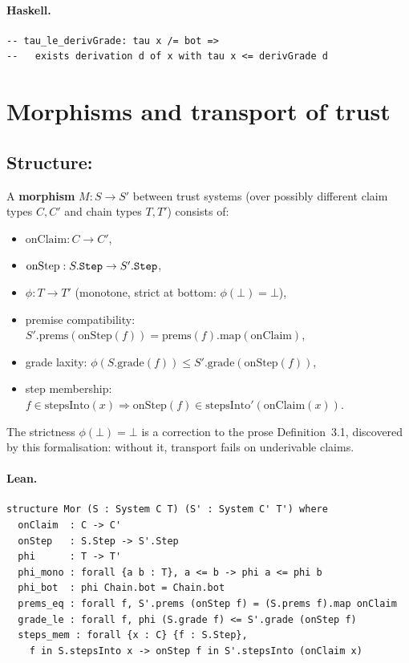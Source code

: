 \documentclass[11pt,a4paper]{article}
\begin{document}
\paragraph{Haskell.}
\begin{lstlisting}[style=haskell]
-- tau_le_derivGrade: tau x /= bot =>
--   exists derivation d of x with tau x <= derivGrade d
\end{lstlisting}

\section{Morphisms and transport of trust}

\subsection{Structure: }

\begin{defn}
A \textbf{morphism} $M : S \to S'$ between trust systems (over possibly
different claim types $C, C'$ and chain types $T, T'$) consists of:
\begin{itemize}
  \item $\mathrm{onClaim} : C \to C'$,
  \item $\mathrm{onStep} : S.\texttt{Step} \to S'.\texttt{Step}$,
  \item $\phi : T \to T'$ (monotone, strict at bottom: $\phi(\bot) = \bot$),
  \item premise compatibility: $S'.\mathrm{prems}(\mathrm{onStep}(f)) =
    \mathrm{prems}(f).\mathrm{map}(\mathrm{onClaim})$,
  \item grade laxity: $\phi(S.\mathrm{grade}(f)) \le
    S'.\mathrm{grade}(\mathrm{onStep}(f))$,
  \item step membership: $f \in \mathrm{stepsInto}(x) \Rightarrow
    \mathrm{onStep}(f) \in \mathrm{stepsInto}'(\mathrm{onClaim}(x))$.
\end{itemize}
The strictness $\phi(\bot) = \bot$ is a correction to the prose
Definition~3.1, discovered by this formalisation: without it, transport
fails on underivable claims.
\end{defn}

\paragraph{Lean.}
\begin{lstlisting}[style=lean]
structure Mor (S : System C T) (S' : System C' T') where
  onClaim  : C -> C'
  onStep   : S.Step -> S'.Step
  phi      : T -> T'
  phi_mono : forall {a b : T}, a <= b -> phi a <= phi b
  phi_bot  : phi Chain.bot = Chain.bot
  prems_eq : forall f, S'.prems (onStep f) = (S.prems f).map onClaim
  grade_le : forall f, phi (S.grade f) <= S'.grade (onStep f)
  steps_mem : forall {x : C} {f : S.Step},
    f in S.stepsInto x -> onStep f in S'.stepsInto (onClaim x)
\end{lstlisting}
\end{document}
